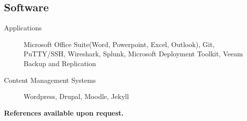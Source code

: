 \documentclass{article}
\begin{document}
\begin{samepage}
\subsection{Software}

\begin{description}
\item[Applications] Microsoft Office Suite(Word, Powerpoint, Excel, Outlook), Git, PuTTY/SSH, Wireshark, Splunk, Microsoft Deployment Toolkit, Veeam Backup and Replication
\item[Content Management Systems] Wordpress, Drupal, Moodle, Jekyll
\end{description}


\begin{center}
\textbf{References available upon request.}
\end{center}

\thispagestyle{empty}
\end{samepage}
\end{document}
